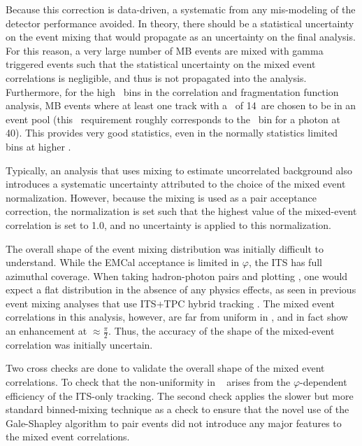 Because this correction is data-driven, a systematic from any mis-modeling of the detector performance avoided. In theory, there should be a statistical uncertainty on the event mixing that would propagate as an uncertainty on the final analysis. For this reason, a very large number of MB events are mixed with gamma triggered events such that the statistical uncertainty on the mixed event correlations is negligible, and thus is not propagated into the analysis. Furthermore, for the high \zt~bins in the correlation and fragmentation function analysis, MB events where at least one track with a \pt~of 14\GeVc~are chosen to be in an event pool (this \pt~requirement roughly corresponds to the \zt~bin for a photon at 40\GeVc). This provides very good statistics, even in the normally statistics limited bins at higher \zt.

 Typically, an analysis that uses mixing to estimate uncorrelated background also introduces a systematic uncertainty attributed to the choice of the mixed event normalization. However, because the mixing is used as a pair acceptance correction, the normalization is set such that the highest value of the mixed-event correlation is set to 1.0, and no uncertainty is applied to this normalization.

 The overall shape of the event mixing distribution was initially difficult to understand. While the EMCal acceptance is limited in $\varphi$, the ITS has full azimuthal coverage. When taking hadron-photon pairs and plotting \deltaphi, one would expect a flat distribution in the absence of any physics effects, as seen in previous event mixing analyses that use ITS+TPC hybrid tracking \cite{Singh2021a}. The mixed event correlations in this analysis, however, are far from uniform in \deltaphi, and in fact show an enhancement at $\approx\frac{\pi}{2}$. Thus, the accuracy of the shape of the mixed-event correlation was initially uncertain.

Two cross checks are done to validate the overall shape of the mixed event correlations. To check that the non-uniformity in \deltaphi~ arises from the $\varphi$-dependent efficiency of the ITS-only tracking. The second check applies the slower but more standard binned-mixing technique as a check to ensure that the novel use of the Gale-Shapley algorithm to pair events did not introduce any major features to the mixed event correlations.

